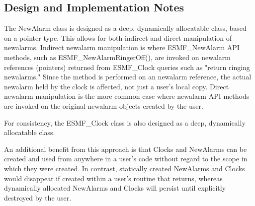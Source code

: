 
\subsection{Design and Implementation Notes}

The NewAlarm class is designed as a deep, dynamically allocatable class,
based on a pointer type.  This allows for both indirect and direct
manipulation of newalarms.  Indirect newalarm manipulation is where ESMF\_NewAlarm API
methods, such as ESMF\_NewAlarmRingerOff(), are invoked on newalarm references
(pointers) returned from ESMF\_Clock queries such as "return ringing newalarms."
Since the method is performed on an newalarm reference, the actual newalarm held
by the clock is affected, not just a user's local copy.  Direct newalarm
manipulation is the more common case where newalarm API methods are invoked on
the original newalarm objects created by the user.

For consistency, the ESMF\_Clock class is also designed as a deep, dynamically
allocatable class. 

An additional benefit from this approach is that Clocks and NewAlarms can be
created and used from anywhere in a user's code without regard to the scope
in which they were created.  In contrast, statically created NewAlarms and
Clocks would disappear if created within a user's routine that returns,
whereas dynamically allocated NewAlarms and Clocks will persist until explicitly
destroyed by the user.
